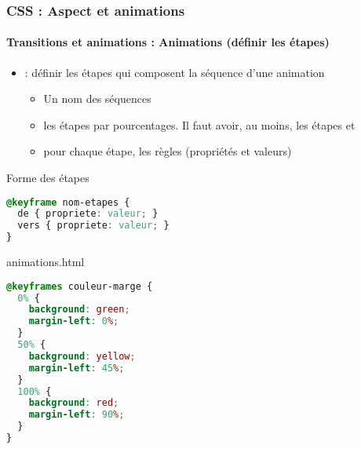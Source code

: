 \documentclass[xcolor=table]{beamer}
\begin{document}
\begin{frame}[fragile]
\frametitle{CSS : Aspect et animations}
\framesubtitle{Transitions et animations : Animations (définir les étapes)}

\begin{minipage}{0.60\textwidth}
	\begin{itemize}
		\item {} : définir les étapes qui composent la séquence d'une animation 
		\begin{itemize}
			\item Un nom des séquences
			\item les étapes par pourcentages. Il faut avoir, au moins, les étapes  et 
			\item pour chaque étape, les règles (propriétés et valeurs)
		\end{itemize}
	\end{itemize}
\end{minipage}
%
\begin{minipage}{0.38\textwidth}
\begin{block}{Forme des étapes}
\lstset{escapeinside=**}
\tiny\bfseries\vspace{-6pt}
\begin{lstlisting}[language={CSS}]
@keyframe nom-etapes {
  de { propriete: valeur; }
  vers { propriete: valeur; }
}
\end{lstlisting}\vspace{-6pt}
\end{block}
\begin{exampleblock}{animations.html}
\lstset{escapeinside=**}
\tiny\bfseries\vspace{-6pt}
\begin{lstlisting}[language={CSS}]
@keyframes couleur-marge {
  0% {
    background: green;
    margin-left: 0%;
  }
  50% {
    background: yellow;
    margin-left: 45%;
  }
  100% {
    background: red;
    margin-left: 90%;
  }
}
\end{lstlisting}\vspace{-6pt}
\end{exampleblock}
\end{minipage}
\end{frame}
\end{document}

